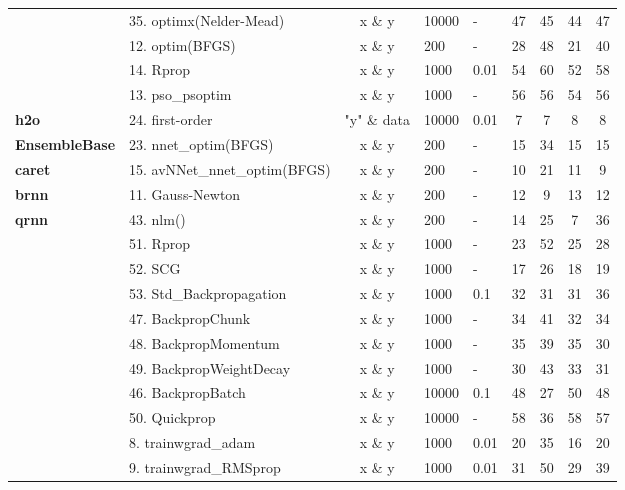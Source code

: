 \begin{Schunk}
\begin{table}
\begin{tabular}[t]{>{\bfseries}llcllcccc}
\multirow{-2}{*}{\raggedright\arraybackslash monmlp} & 35. optimx(Nelder-Mead) & x \& y & 10000 & - & 47 & 45 & 44 & 47\\
\cmidrule{1-9}
 & 12. optim(BFGS) & x \& y & 200 & - & 28 & 48 & 21 & 40\\

 & 14. Rprop & x \& y & 1000 & 0.01 & 54 & 60 & 52 & 58\\

\multirow{-3}{*}{\raggedright\arraybackslash CaDENCE} & 13. pso\_psoptim & x \& y & 1000 & - & 56 & 56 & 54 & 56\\
\cmidrule{1-9}
h2o & 24. first-order & "y" \& data & 10000 & 0.01 & 7 & 7 & 8 & 8\\
\cmidrule{1-9}
EnsembleBase & 23. nnet\_optim(BFGS) & x \& y & 200 & - & 15 & 34 & 15 & 15\\
\cmidrule{1-9}
caret & 15. avNNet\_nnet\_optim(BFGS) & x \& y & 200 & - & 10 & 21 & 11 & 9\\
\cmidrule{1-9}
brnn & 11. Gauss-Newton & x \& y & 200 & - & 12 & 9 & 13 & 12\\
\cmidrule{1-9}
qrnn & 43. nlm() & x \& y & 200 & - & 14 & 25 & 7 & 36\\
\cmidrule{1-9}
 & 51. Rprop & x \& y & 1000 & - & 23 & 52 & 25 & 28\\

 & 52. SCG & x \& y & 1000 & - & 17 & 26 & 18 & 19\\

 & 53. Std\_Backpropagation & x \& y & 1000 & 0.1 & 32 & 31 & 31 & 36\\

 & 47. BackpropChunk & x \& y & 1000 & - & 34 & 41 & 32 & 34\\

 & 48. BackpropMomentum & x \& y & 1000 & - & 35 & 39 & 35 & 30\\

 & 49. BackpropWeightDecay & x \& y & 1000 & - & 30 & 43 & 33 & 31\\

 & 46. BackpropBatch & x \& y & 10000 & 0.1 & 48 & 27 & 50 & 48\\

\multirow{-8}{*}{\raggedright\arraybackslash RSNNS} & 50. Quickprop & x \& y & 10000 & - & 58 & 36 & 58 & 57\\
\cmidrule{1-9}
 & 8. trainwgrad\_adam & x \& y & 1000 & 0.01 & 20 & 35 & 16 & 20\\

 & 9. trainwgrad\_RMSprop & x \& y & 1000 & 0.01 & 31 & 50 & 29 & 39\\


\end{tabular}
\end{table}
\end{Schunk}
